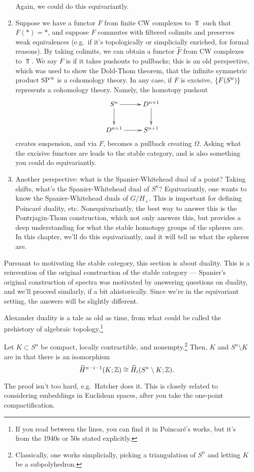 \begin{enumerate}
	Again, we could do this equivariantly.
	\item Suppose we have a functor $F$ from finite CW complexes to $\Top$ such that $F(*) = *$, and suppose $F$
	commutes with filtered colimits and preserves weak equivalences (e.g.\ if it's topologically or simplicially
	enriched, for formal reasons). By taking colimits, we can obtain a functor $\widehat F$ from CW complexes to
	$\Top$. We say $F$ is  if it takes pushouts to pullbacks; this is an old perspective, which was
	used to show the Dold-Thom theorem, that the infinite symmetric product $\mathrm{SP}^\infty$ is a cohomology
	theory. In any case, if $F$ is excisive, $\{F(S^n)\}$ represents a cohomology theory. Namely, the homotopy
	pushout
	\[\xymatrix{S^n\ar[r]\ar[d] & D^{n+1}\ar[d]\\
	D^{n+1}\ar[r] & S^{n+1}
	}\]
	creates suspension, and via $F$, becomes a pullback creating $\Omega$. Asking what the excisive functors are
	leads to the stable category, and is also something you could do equivariantly.
	\item Another perspective: what is the Spanier-Whitehead dual of a point? Taking shifts, what's the
	Spanier-Whitehead dual of $S^n$? Equivariantly, one wants to know the Spanier-Whitehead duals of $G/H_+$. This
	is important for defining Poincaré duality, etc. Nonequivariantly, the best way to answer this is the
	Pontrjagin-Thom construction, which not only answers this, but provides a deep understanding for what the
	stable homotopy groups of the spheres are. In this chapter, we'll do this equivariantly, and it will tell us
	what the spheres are.
\end{enumerate}
Pursuant to motivating the stable category, this section is about duality. This is a reinvention of the original
construction of the stable category --- Spanier's original construction of spectra was motivated by answering
questions on duality, and we'll proceed similarly, if a bit ahistorically. Since we're in the equivariant setting,
the answers will be slightly different.

Alexander duality is a tale as old as time, from what could be called the prehistory of algebraic
topology.\footnote{If you read between the lines, you can find it in Poincaré's works, but it's from the 1940s or
50s stated explicitly.}
\begin{thm}
Let $K\subset S^n$ be compact, locally contractible, and nonempty.\footnote{Classically, one works simplicially,
picking a triangulation of $S^n$ and letting $K$ be a subpolyhedron.} Then, $K$ and $S^n\setminus K$ are
 in that there is an isomorphism
\[\widetilde H^{n-i-1}(K;\mathbb Z)\cong \widetilde H_i(S^n\setminus K;\mathbb Z).\]
\end{thm}
The proof isn't too hard, e.g.\ Hatcher does it. This is closely related to considering embeddings in Euclidean
spaces, after you take the one-point compactification.

